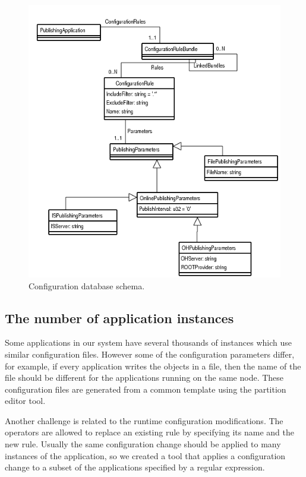 \begin{figure}[ht!]
\centering
\includegraphics[scale=0.75]{Images/oks_schema.png}
\caption{Configuration database schema.}
\end{figure}

\subsection*{The number of application instances}

Some applications in our system have several thousands of instances which use similar configuration files. However some of the configuration parameters differ, for example, if every application writes the objects in a file, then the name of the file should be different for the applications running on the same node. These configuration files are generated from a common template using the partition editor tool.

Another challenge is related to the runtime configuration modifications. The operators are allowed to replace an existing rule by specifying its name and the new rule. Usually the same configuration change should be applied to many instances of the application, so we created a tool that applies a configuration change to a subset of the applications specified by a regular expression.
